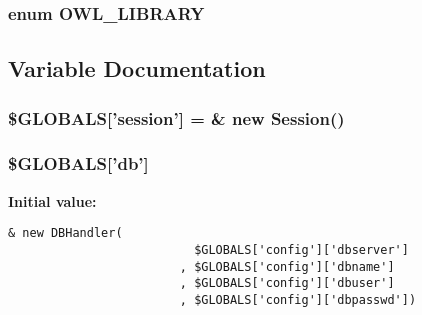 \hypertarget{OWLloader_8php_74eed08508c8b70677c4167acf49e427}{
\subsubsection{\setlength{\rightskip}{0pt plus 5cm}enum {\bf OWL\_\-LIBRARY}}}
\label{OWLloader_8php_74eed08508c8b70677c4167acf49e427}




\subsection{Variable Documentation}
\hypertarget{OWLloader_8php_95ec104c636100b9022c09964e2b0725}{
\subsubsection{\setlength{\rightskip}{0pt plus 5cm}\$GLOBALS\mbox{[}'session'\mbox{]} = \& new {\bf Session}()}}
\label{OWLloader_8php_95ec104c636100b9022c09964e2b0725}


\hypertarget{OWLloader_8php_14159e18d9b64fd1e16054f784eda311}{
\subsubsection{\setlength{\rightskip}{0pt plus 5cm}\$GLOBALS\mbox{[}'db'\mbox{]}}}
\label{OWLloader_8php_14159e18d9b64fd1e16054f784eda311}


\textbf{Initial value:}

\begin{Code}\begin{verbatim}& new DBHandler(
                          $GLOBALS['config']['dbserver']
                        , $GLOBALS['config']['dbname']
                        , $GLOBALS['config']['dbuser']
                        , $GLOBALS['config']['dbpasswd'])
\end{verbatim}
\end{Code}
